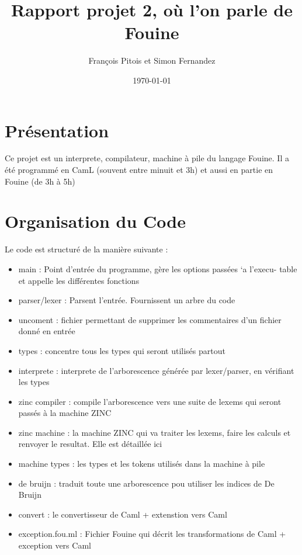 \documentclass{article}
\title{Rapport projet 2, où l'on parle de Fouine}
\author{François Pitois et Simon Fernandez}
\date{\today}
\begin{document}
\maketitle

\section{Présentation}
Ce projet est un interprete, compilateur, machine à pile du langage Fouine.
Il a été programmé en CamL (souvent entre minuit et 3h) et aussi en partie
en Fouine (de 3h à 5h)

\section{Organisation du Code}
Le code est structuré de la manière suivante :
\begin{itemize}
\item  main : Point d’entrée du programme, gère les options passées `a l’execu-
table et appelle les différentes fonctions
\item  parser/lexer : Parsent l’entrée. Fournissent un arbre du code
\item  uncoment : fichier permettant de supprimer les commentaires d’un fichier
donné en entrée
\item types : concentre tous les types qui seront utilisés partout
\item  interprete : interprete de l’arborescence générée par lexer/parser, en vérifiant
les types
\item  zinc compiler : compile l’arborescence vers une suite de lexems qui seront
passés à la machine ZINC
\item  zinc machine : la machine ZINC qui va traiter les lexems, faire les calculs
et renvoyer le resultat. Elle est détaillée ici \cite{Zinc}
\item  machine types : les types et les tokens utilisés dans la machine à pile
\item de bruijn : traduit toute une arborescence pou utiliser les indices de De
Bruijn
\item convert : le convertisseur de Caml + extenstion vers Caml
\item exception.fou.ml : Fichier Fouine qui décrit les transformations de Caml + exception vers Caml
\end{itemize}
\end{document}
